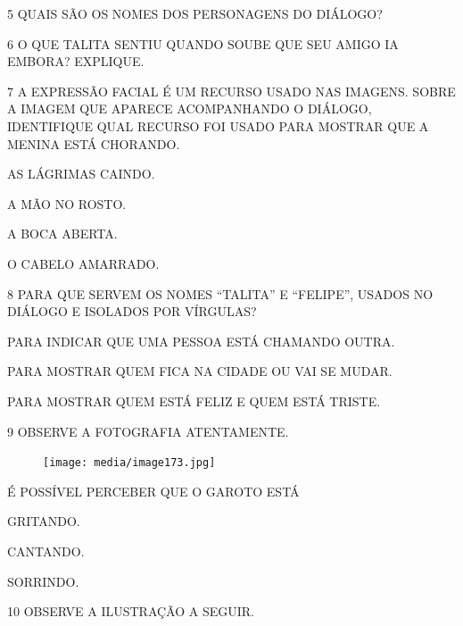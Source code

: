 \num{5} QUAIS SÃO OS NOMES DOS PERSONAGENS DO DIÁLOGO?


\num{6} O QUE TALITA SENTIU QUANDO SOUBE QUE SEU AMIGO IA EMBORA? EXPLIQUE.


\num{7} A EXPRESSÃO FACIAL É UM RECURSO USADO NAS 
IMAGENS. SOBRE A IMAGEM QUE APARECE ACOMPANHANDO 
O DIÁLOGO, IDENTIFIQUE QUAL RECURSO FOI USADO PARA MOSTRAR QUE A MENINA ESTÁ CHORANDO.

\begin{multicols}{2}
\begin{boxlist}[itemsep=1pt]
 AS LÁGRIMAS CAINDO.

 A MÃO NO ROSTO.

 A BOCA ABERTA.

 O CABELO AMARRADO.
\end{boxlist}
\end{multicols}

\num{8} PARA QUE SERVEM OS NOMES ``TALITA'' E ``FELIPE'', USADOS NO DIÁLOGO E ISOLADOS POR VÍRGULAS?

\begin{boxlist}[itemsep=1pt]
 PARA INDICAR QUE UMA PESSOA ESTÁ CHAMANDO OUTRA.

 PARA MOSTRAR QUEM FICA NA CIDADE OU VAI SE MUDAR.

 PARA MOSTRAR QUEM ESTÁ FELIZ E QUEM ESTÁ TRISTE.
\end{boxlist}


\num{9} OBSERVE A FOTOGRAFIA ATENTAMENTE.

\begin{figure}[H]
\centering
\texttt{[image: media/image173.jpg]}
\end{figure}

É POSSÍVEL PERCEBER QUE O GAROTO ESTÁ

\begin{multicols}{3}
\begin{boxlist}
 GRITANDO. 

 CANTANDO.

 SORRINDO.
\end{boxlist}
\end{multicols}

\pagebreak

\num{10} OBSERVE A ILUSTRAÇÃO A SEGUIR. 


